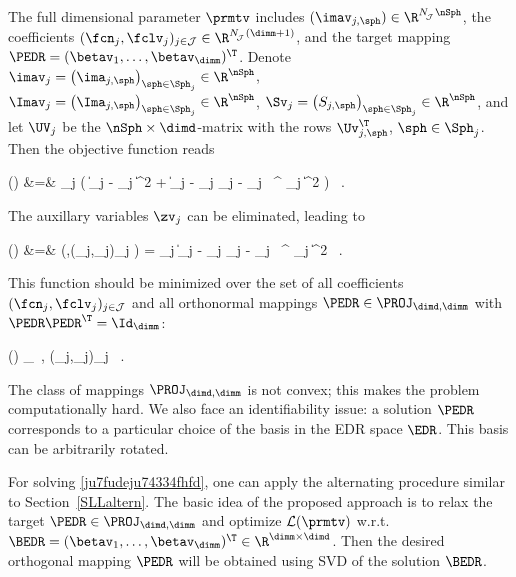 The full dimensional parameter \( \prmtv \) includes
\( (\imav_{j,\sph}) \in \R^{\nJJJ \nSph} \), 
the coefficients \( (\fcn_{j},\fclv_{j})_{j \in \JJJ} \in \R^{\nJJJ(\dimm+1)} \),
and the target mapping \( \PEDR = (\betav_{1},\ldots,\betav_{\dimm})^{\T} \).
Denote \( \imav_{j} = \bigl( \ima_{j,\sph} \bigr)_{\sph \in \Sph_{j}} \in \R^{\nSph} \), 
\( \Imav_{j} = \bigl( \Ima_{j,\sph} \bigr)_{\sph \in \Sph_{j}} \in \R^{\nSph} \),
\( \Sv_{j} = \bigl( S_{j,\sph} \bigr)_{\sph \in \Sph_{j}} \in \R^{\nSph} \),
and let \( \UV_{j} \) be the \( \nSph \times \dimd \)-matrix with the rows \( \Uv_{j,\sph}^{\T} \),
\( \sph \in \Sph_{j} \).
Then the objective function reads
\begin{EQA}
	\LL(\prmtv)
	&=&
	 \sum_{j \in \JJJ} \Bigl( \| \Imav_{j} - \imav_{j} \|^{2} 
		+ \bigl\| \imav_{j} - \fcn_{j} \Sv_{j} - \UV_{j} \, \PEDR^{\T} \fclv_{j} \bigr\|^{2} \Bigr) 
	\, .
	\qquad
\end{EQA}
The auxillary variables \( \zv_{j} \) can be eliminated, leading to
\begin{EQA}[rcl]
	\LL(\prmtv)
	&=&
	\LL(\PEDR,(\fcn_{j},\fclv_{j})_{j \in \JJJ})
	=
	 \sum_{j \in \JJJ} \bigl\| \Imav_{j} - \fcn_{j} \Sv_{j} - \UV_{j} \, \PEDR^{\T} \fclv_{j} \bigr\|^{2}	
	\, .
	\qquad
\label{gtgyuy6ew5dtde32322jtmiG0}	
\end{EQA}
This function should be minimized over the set of all coefficients \( (\fcn_{j},\fclv_{j})_{j \in \JJJ} \) and all
orthonormal mappings \( \PEDR \in \PROJ_{\dimd,\dimm} \) with \( \PEDR \PEDR^{\T} = \Id_{\dimm} \):
\begin{EQA}[c]
	\LL(\prmtv)
	\to
	\inf_{\PEDR \, , (\fcn_{j},\fclv_{j})_{j \in \JJJ}} 
	\, .
\label{ju7fudeju74334fhfd}
\end{EQA}
The class of mappings \( \PROJ_{\dimd,\dimm} \) is not convex; this makes the problem computationally hard.
We also face an identifiability issue: a solution \( \PEDR \) corresponds to 
a particular choice of the basis in the EDR space \( \EDR \).
This basis can be arbitrarily rotated.

\label{SaltMI}
For solving \eqref{ju7fudeju74334fhfd}, one can apply the alternating procedure similar to Section~\ref{SLLaltern}.
The basic idea of the proposed approach is to relax the target \( \PEDR \in \PROJ_{\dimd,\dimm} \)
and optimize \( \LL(\prmtv) \) w.r.t. 
\( \BEDR = (\betav_{1},\ldots,\betav_{\dimm})^{\T} \in \R^{\dimm \times \dimd} \). 
Then the desired orthogonal mapping \( \PEDR \) will be obtained using SVD 
of the solution \( \BEDR \).
%

